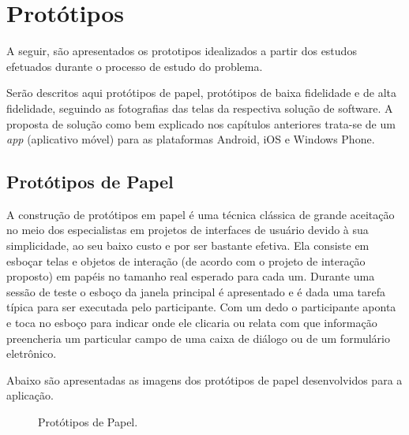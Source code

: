 \chapter[Protótipos]{Protótipos}
\label{chap:prototipos}

	A seguir, são apresentados os prototipos idealizados a partir dos estudos efetuados durante o processo de estudo do problema.
	
	Serão descritos aqui protótipos de papel, protótipos de baixa fidelidade e de alta fidelidade, seguindo as fotografias das telas da respectiva solução de software. A proposta de solução como bem explicado nos capítulos anteriores trata-se de um \emph{app} (aplicativo móvel) para as plataformas Android, iOS e Windows Phone.

	\section[Protótipos de Papel]{Protótipos de Papel}
	\label{sec:prototipos_papel}

		A construção de protótipos em papel é uma técnica clássica de grande aceitação no meio dos especialistas em projetos de interfaces de usuário devido à sua simplicidade, ao seu baixo custo e por ser bastante efetiva. Ela consiste em esboçar telas e objetos de interação (de acordo com o projeto de interação proposto) em papéis no tamanho real esperado para cada um. Durante uma sessão de teste o esboço da janela principal é apresentado e é dada uma tarefa típica para ser executada pelo participante. Com um dedo o participante aponta e toca no esboço para indicar onde ele clicaria ou relata com que informação preencheria um particular campo de uma caixa de diálogo ou de um formulário eletrônico. \cite{paper}

		Abaixo são apresentadas as imagens dos protótipos de papel desenvolvidos para a aplicação.

		\newpage
		\begin{landscape}
		\begin{figure}[!htb]
			\centering
			\quad %
			\quad
			\quad
			\quad
			\quad
			\quad
			\caption{Protótipos de Papel.}
			\label{fig01}
		\end{figure}
		\end{landscape}


